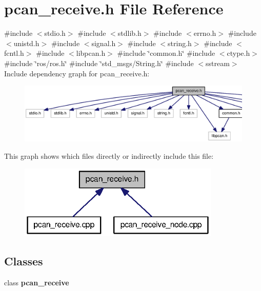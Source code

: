 \section{pcan\-\_\-receive.\-h \-File \-Reference}
\label{pcan__receive_8h}
{\ttfamily \#include $<$stdio.\-h$>$}\*
{\ttfamily \#include $<$stdlib.\-h$>$}\*
{\ttfamily \#include $<$errno.\-h$>$}\*
{\ttfamily \#include $<$unistd.\-h$>$}\*
{\ttfamily \#include $<$signal.\-h$>$}\*
{\ttfamily \#include $<$string.\-h$>$}\*
{\ttfamily \#include $<$fcntl.\-h$>$}\*
{\ttfamily \#include $<$libpcan.\-h$>$}\*
{\ttfamily \#include \char`\"{}common.\-h\char`\"{}}\*
{\ttfamily \#include $<$ctype.\-h$>$}\*
{\ttfamily \#include \char`\"{}ros/ros.\-h\char`\"{}}\*
{\ttfamily \#include \char`\"{}std\-\_\-msgs/\-String.\-h\char`\"{}}\*
{\ttfamily \#include $<$sstream$>$}\*
\-Include dependency graph for pcan\-\_\-receive.\-h\-:\nopagebreak
\begin{figure}[H]
\begin{center}
\leavevmode
\includegraphics[width=350pt]{pcan__receive_8h__incl}
\end{center}
\end{figure}
\-This graph shows which files directly or indirectly include this file\-:\nopagebreak
\begin{figure}[H]
\begin{center}
\leavevmode
\includegraphics[width=272pt]{pcan__receive_8h__dep__incl}
\end{center}
\end{figure}
\subsection*{\-Classes}
\begin{DoxyCompactItemize}
\item 
class {\bf pcan\-\_\-receive}
\end{DoxyCompactItemize}
